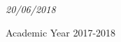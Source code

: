 \documentclass[a4paper,12pt,twoside]{report}
\begin{document}
\vspace{13mm}

\begin{center}
\vspace{-4mm}
\it{\large{20/06/2018}}
\end{center}
\begin{center}
\vspace{-3mm}
{\large{Academic Year 2017-2018}}
\end{center}

\end{document}
